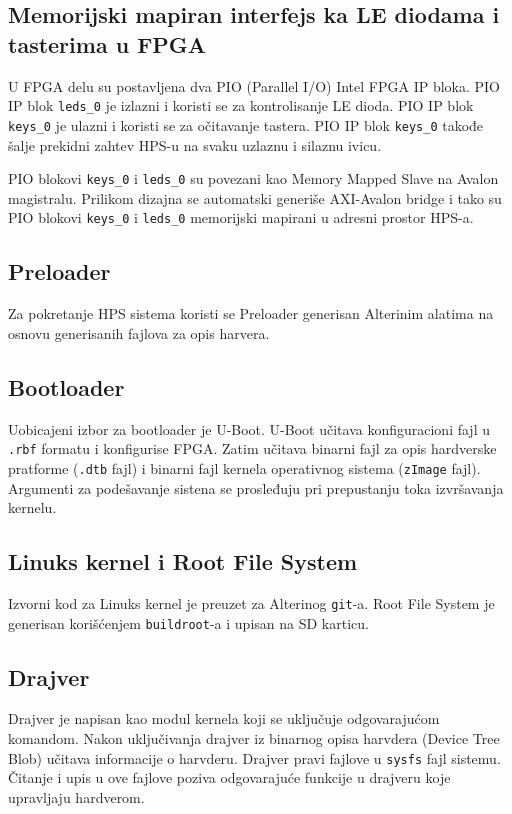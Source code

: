 \subsection{Memorijski mapiran interfejs ka LE diodama i tasterima u FPGA}
U FPGA delu su postavljena dva PIO (Parallel I/O) Intel FPGA IP bloka. PIO IP blok \texttt{leds\_0} je izlazni i koristi se za kontrolisanje LE dioda. PIO IP blok \texttt{keys\_0} je ulazni i koristi se za očitavanje tastera. PIO IP blok \texttt{keys\_0} takođe šalje prekidni zahtev HPS-u na svaku uzlaznu i silaznu ivicu.

PIO blokovi \texttt{keys\_0} i \texttt{leds\_0} su povezani kao Memory Mapped Slave na Avalon magistralu. Prilikom dizajna se automatski generiše AXI-Avalon bridge i tako su PIO blokovi \texttt{keys\_0} i \texttt{leds\_0} memorijski mapirani u adresni prostor HPS-a.

\subsection{Preloader}
Za pokretanje HPS sistema koristi se Preloader generisan Alterinim alatima na osnovu generisanih fajlova za opis harvera.

\subsection{Bootloader}
Uobicajeni izbor za bootloader je U-Boot. U-Boot  učitava konfiguracioni fajl u \texttt{.rbf} formatu i konfigurise FPGA. Zatim učitava binarni fajl za opis hardverske pratforme (\texttt{.dtb} fajl) i binarni fajl kernela operativnog sistema (\texttt{zImage} fajl). Argumenti za podešavanje sistena se prosleđuju pri prepustanju toka izvršavanja kernelu.

\subsection{Linuks kernel i Root File System}
Izvorni kod za Linuks kernel je preuzet za Alterinog \texttt{git}-a. Root File System je generisan korišćenjem \texttt{buildroot}-a i upisan na SD karticu.

\subsection{Drajver}
Drajver je napisan kao modul kernela koji se uključuje odgovarajućom komandom. Nakon uključivanja drajver iz binarnog opisa harvdera (Device Tree Blob) učitava informacije o harvderu. Drajver pravi fajlove u \texttt{sysfs} fajl sistemu. Čitanje i upis u ove fajlove poziva odgovarajuće funkcije u drajveru koje upravljaju hardverom.

